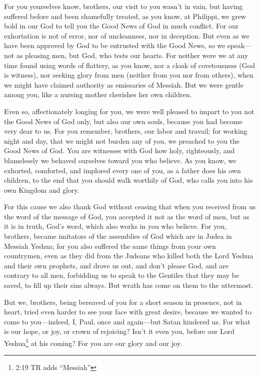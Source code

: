 \mychapter{} \myverse*{}For you yourselves know, brothers, our visit to you wasn’t in vain,
\myverse{}but having suffered before and been shamefully treated, as you know, at Philippi,
we grew bold in our God to tell you the Good News of God in much conflict.
\myverse{}For our exhortation is not of error, nor of uncleanness, nor in deception.
\myverse{}But even as we have been approved by God to be entrusted with the Good News,
so we speak—not as pleasing men, but God, who tests our hearts.
\myverse{}For neither were we at any time found using words of flattery, as you know,
nor a cloak of covetousness (God is witness),
\myverse{}nor seeking glory from men (neither from you nor from others), when we might
have claimed authority as emissaries of Messiah.
\myverse{}But we were gentle among you, like a nursing mother cherishes her own children.

\myverse{}Even so, affectionately longing for you, we were well pleased to
impart to you not the Good News of God only, but also our own souls, because you had become very dear
to us.
\myverse{}For you remember, brothers, our labor and travail; for working night and day,
that we might not burden any of you, we preached to you the Good News of God.
\myverse{}You are witnesses with God how holy, righteously, and blamelessly we behaved
ourselves toward you who believe.
\myverse{}As you know, we exhorted, comforted, and implored every one of you, as a father
does his own children,
\myverse{}to the end that you should walk worthily of God, who calls you into his own
Kingdom and glory.

\myverse{}For this cause we also thank God without ceasing that when you
received from us the word of the message of God, you accepted it not as the word of men, but as it is
in truth, God’s word, which also works in you who believe.
\myverse{}For you, brothers, became imitators of the assemblies of God which are in
Judea in Messiah Yeshua; for you also suffered the same things from your own countrymen, even as they
did from the Judeans
\myverse{}who killed both the Lord Yeshua and their own prophets, and drove us out,
and don’t please God, and are contrary to all men,
\myverse{}forbidding us to speak to the Gentiles that they may be saved, to fill up
their sins always. But wrath has come on them to the uttermost.

\myverse{}But we, brothers, being bereaved of you for a short season in
presence, not in heart, tried even harder to see your face with great desire,
\myverse{}because we wanted to come to you—indeed, I, Paul, once and again—but Satan
hindered us.
\myverse{}For what is our hope, or joy, or crown of rejoicing? Isn’t it even you, before
our Lord Yeshua\footnote{2:19 TR adds “Messiah”} at his coming?
\myverse{}For you are our glory and our joy.


